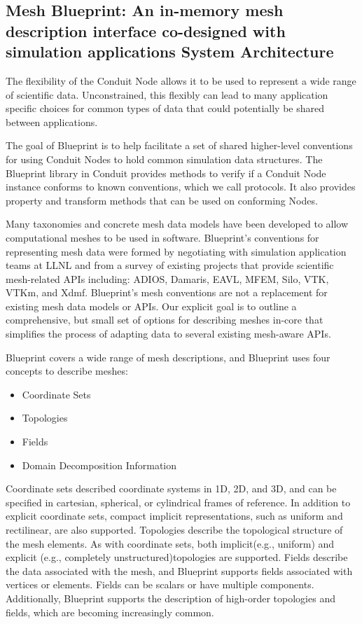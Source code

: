 \subsection{Mesh Blueprint: An in-memory mesh description interface co-designed with simulation applications
System Architecture}

The flexibility of the Conduit Node allows it to be used to represent a
wide range of scientific data.
%
Unconstrained, this flexibly can lead to
many application specific choices for common types of data that could
potentially be shared between applications.

The goal of Blueprint is to help facilitate a set of shared higher-level
conventions for using Conduit Nodes to hold common simulation data structures.
%
The Blueprint library in Conduit provides methods to verify if a Conduit
Node instance conforms to known conventions, which we call protocols.
%
It also provides property and transform methods that can be used on conforming Nodes.

Many taxonomies and concrete mesh data models have been developed to allow
computational meshes to be used in software.
%
Blueprint’s conventions for representing mesh data were formed by negotiating
with simulation application teams at LLNL and from a survey of existing
projects that provide scientific mesh-related APIs including: ADIOS, Damaris,
EAVL, MFEM, Silo, VTK, VTKm, and Xdmf.
%
Blueprint’s mesh conventions are not a replacement for existing mesh data
models or APIs.
%
Our explicit goal is to outline a comprehensive, but small set of options
for describing meshes in-core that simplifies the process of adapting data
to several existing mesh-aware APIs.

Blueprint covers a wide range of mesh descriptions, and
Blueprint uses four concepts to describe meshes:

\begin{itemize}
  \item Coordinate Sets
  \item Topologies
  \item Fields
  \item Domain Decomposition Information
\end{itemize}

Coordinate sets described coordinate systems in 1D, 2D, and 3D, and
can be specified in cartesian, spherical, or cylindrical frames of reference.
%
In addition to explicit coordinate sets, compact implicit representations,
such as uniform and rectilinear, are also supported.
%
Topologies describe the topological structure of the mesh elements.
%
As with coordinate sets, both implicit(e.g., uniform) and explicit
(e.g., completely unstructured)topologies are supported.
%
Fields describe the data associated with the mesh, and Blueprint supports
fields associated with vertices or elements.
%
Fields can be scalars or have multiple components.
%
Additionally, Blueprint supports the description of high-order
topologies and fields, which are becoming increasingly common.


